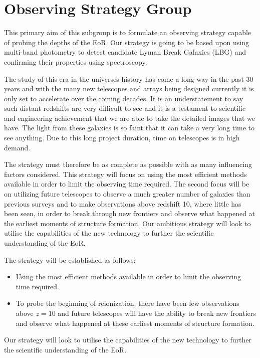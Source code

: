 \section{Observing Strategy Group} %
\label{sec:observing_strategy_group}
	This primary aim of this subgroup is to formulate an observing strategy capable of probing the depths of the EoR. Our strategy is going to be based upon using multi-band photometry to detect candidate Lyman Break Galaxies (LBG) and confirming their properties using spectroscopy.

	The study of this era in the universes history has come a long way in the past 30 years and with the many new telescopes and arrays being designed currently it is only set to accelerate over the coming decades. It is an understatement to say such distant redshifts are very difficult to see and it is a testament to scientific and engineering achievement that we are able to take the detailed images that we have. The light from these galaxies is so faint that it can take a very long time to see anything. Due to this long project duration, time on telescopes is in high demand.

	The strategy must therefore be as complete as possible with as many influencing factors considered. This strategy will focus on using the most efficient methods available in order to limit the observing time required. The second focus will be on utilizing future telescopes to observe a much greater number of galaxies than previous surveys and to make observations above redshift 10, where little has been seen, in order to break through new frontiers and observe what happened at the earliest moments of structure formation. Our ambitious strategy will look to utilise the capabilities of the new technology to further the scientific understanding of the EoR.

	The strategy will be established as follows:
	\begin{itemize}
		\item Using the most efficient methods available in order to limit the observing time required.
		\item To probe the beginning of reionization; there have been few observations above $z=10$ and future telescopes will have the ability to break new frontiers and observe what happened at these earliest moments of structure formation.
	\end{itemize}

	Our strategy will look to utilise the capabilities of the new technology to further the scientific understanding of the EoR.

